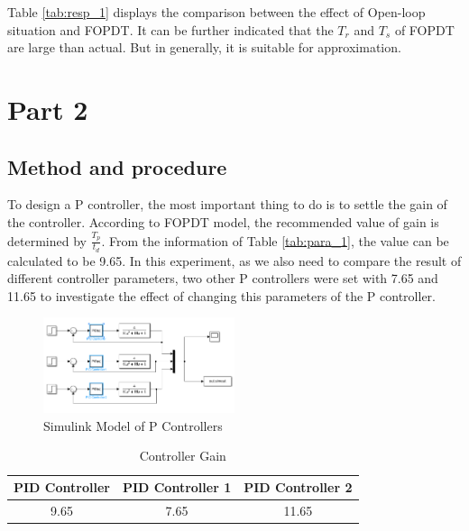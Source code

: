 \documentclass[11pt, a4paper]{article}
\begin{document}
Table \ref{tab:resp_1} displays the comparison between the effect of Open-loop situation and FOPDT. It can be further indicated that the $T_{r}$ and $T_{s}$ of FOPDT are large than actual. But in generally, it is suitable for approximation.

\section{Part 2}

\subsection{Method and procedure}

To design a P controller, the most important thing to do is to settle the gain of the controller. According to FOPDT model, the recommended value of gain is determined by $\frac{T_{p}}{t_{d}}$. From the information of Table \ref{tab:para_1}, the value can be calculated to be 9.65. In this experiment, as we also need to compare the result of different controller parameters, two other P controllers were set with 7.65 and 11.65 to investigate the effect of changing this parameters of the P controller.

\begin{figure}[htbp]     \begin{centering}
    \includegraphics[width=0.5\textwidth]{p2.png}
    \caption{\label{Fig:p2}Simulink Model of P Controllers}
    \end{centering}
    
\end{figure}


\begin{table}[htbp]
\caption{Controller Gain}
\label{tab:pid}
\begin{center}
\begin{tabular}{ccc}
\hline
 PID Controller      & PID Controller 1       & PID Controller 2   \\
\hline
9.65         & 7.65         &  11.65         \\

\hline
\end{tabular}
\end{center}
\end{table}
\end{document}
